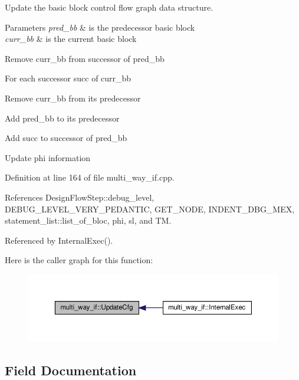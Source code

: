 Update the basic block control flow graph data structure. 


\begin{DoxyParams}{Parameters}
{\em pred\+\_\+bb} & is the predecessor basic block \\
\hline
{\em curr\+\_\+bb} & is the current basic block \\
\hline
\end{DoxyParams}
Remove curr\+\_\+bb from successor of pred\+\_\+bb

For each successor succ of curr\+\_\+bb

Remove curr\+\_\+bb from its predecessor

Add pred\+\_\+bb to its predecessor

Add succ to successor of pred\+\_\+bb

Update phi information 

Definition at line 164 of file multi\+\_\+way\+\_\+if.\+cpp.



References Design\+Flow\+Step\+::debug\+\_\+level, D\+E\+B\+U\+G\+\_\+\+L\+E\+V\+E\+L\+\_\+\+V\+E\+R\+Y\+\_\+\+P\+E\+D\+A\+N\+T\+IC, G\+E\+T\+\_\+\+N\+O\+DE, I\+N\+D\+E\+N\+T\+\_\+\+D\+B\+G\+\_\+\+M\+EX, statement\+\_\+list\+::list\+\_\+of\+\_\+bloc, phi, sl, and TM.



Referenced by Internal\+Exec().

Here is the caller graph for this function\+:
\nopagebreak
\begin{figure}[H]
\begin{center}
\leavevmode
\includegraphics[width=350pt]{dd/dca/classmulti__way__if_acff7c7c7e90fbeabb45e4dec35ec9fa2_icgraph}
\end{center}
\end{figure}


\subsection{Field Documentation}
\mbox{\label{classmulti__way__if_ad84ba355151bfbd19e9f7e9fe554b5d2}} 
